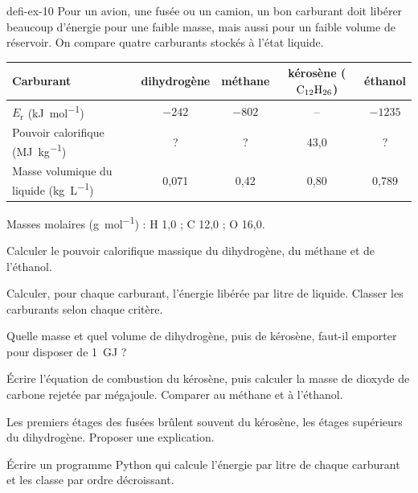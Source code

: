 \begin{blocEdition}{defi-ex-10}
Pour un avion, une fusée ou un camion, un bon carburant doit libérer beaucoup d'énergie pour une faible masse, mais
aussi pour un faible volume de réservoir. On compare quatre carburants stockés à l'état liquide.
\begin{center}
\begin{tabular}{lcccc}
\toprule
Carburant & dihydrogène & méthane & kérosène ($\ce{C12H26}$) & éthanol \\
\midrule
$E_\mathrm{r}$ (\unit{kJ.mol^{-1}}) & $-242$ & $-802$ & -- & $-1235$ \\
Pouvoir calorifique (\unit{MJ.kg^{-1}}) & ? & ? & 43,0 & ? \\
Masse volumique du liquide (\unit{kg.L^{-1}}) & 0,071 & 0,42 & 0,80 & 0,789 \\
\bottomrule
\end{tabular}
\end{center}
Masses molaires (\unit{g.mol^{-1}}) : H 1,0 ; C 12,0 ; O 16,0.
\begin{questions}
\item Calculer le pouvoir calorifique massique du dihydrogène, du méthane et de l'éthanol.
\item Calculer, pour chaque carburant, l'énergie libérée par litre de liquide. Classer les carburants selon chaque critère.
\item Quelle masse et quel volume de dihydrogène, puis de kérosène, faut-il emporter pour disposer de \qty{1}{GJ} ?
\item Écrire l'équation de combustion du kérosène, puis calculer la masse de dioxyde de carbone rejetée par mégajoule.
Comparer au méthane et à l'éthanol.
\item Les premiers étages des fusées brûlent souvent du kérosène, les étages supérieurs du dihydrogène. Proposer une
explication.
\item Écrire un programme Python qui calcule l'énergie par litre de chaque carburant et les classe par ordre décroissant.
\end{questions}
\end{blocEdition}

